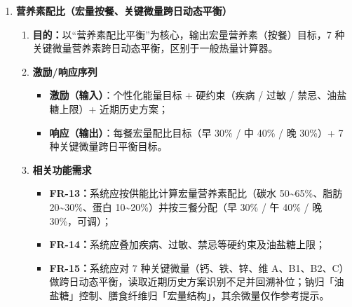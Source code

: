 \documentclass[12pt,a4paper]{ctexart}
\begin{document}
\begin{enumerate}
\item \textbf{营养素配比（宏量按餐、关键微量跨日动态平衡）}
  \begin{enumerate}[label=(\arabic*), leftmargin=10pt, itemsep=2pt, topsep=2pt]
    \item \textbf{目的：}以“营养素配比平衡”为核心，输出宏量营养素（按餐）目标，7 种关键微量营养素跨日动态平衡，区别于一般热量计算器。
    \item \textbf{激励/响应序列}
      \begin{itemize}[leftmargin=*, itemsep=1pt, topsep=1pt]
        \item \textbf{激励（输入）}：个性化能量目标 + 硬约束（疾病 / 过敏 / 禁忌、油盐糖上限）+ 近期历史方案；
        \item \textbf{响应（输出）}：每餐宏量配比目标（早 30\% / 中 40\% / 晚 30\%）+ 7 种关键微量跨日平衡目标。
      \end{itemize}
    \item \textbf{相关功能需求}
      \begin{itemize}[leftmargin=*, itemsep=1pt, topsep=1pt]
        \item \textbf{FR-13：}系统应按供能比计算宏量营养素配比（碳水 50\textasciitilde{}65\%、脂肪 20\textasciitilde{}30\%、蛋白 10\textasciitilde{}20\%）并按三餐分配（早 30\% / 午 40\% / 晚 30\%，可调）；
        \item \textbf{FR-14：}系统应叠加疾病、过敏、禁忌等硬约束及油盐糖上限；
        \item \textbf{FR-15：}系统应对 7 种关键微量（钙、铁、锌、维 A、B1、B2、C）做跨日动态平衡，读取近期历史方案识别不足并回溯补位；钠归「油盐糖」控制、膳食纤维归「宏量结构」，其余微量仅作参考提示。
      \end{itemize}
  \end{enumerate}


\end{enumerate}
\end{document}
